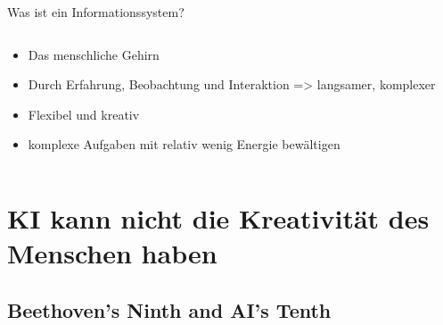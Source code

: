 \documentclass[169,9pt]{beamer}
\begin{document}
\begin{frame}{Was ist ein Informationssystem?}
\begin{itemize}
\begin{columns}
\begin{column}{0.45\textwidth}
\begin{itemize}
                            \item Das menschliche Gehirn
                            \item Durch Erfahrung, Beobachtung und Interaktion => langsamer, komplexer
                            \item Flexibel und kreativ
                            \item komplexe Aufgaben mit relativ wenig Energie bewältigen
                        \end{itemize}
                \end{column}
            \end{columns}
    \end{itemize}
\end{frame}

\section{KI kann nicht die Kreativität des Menschen haben}
\subsection{Beethoven's Ninth and AI's Tenth}
\end{document}
